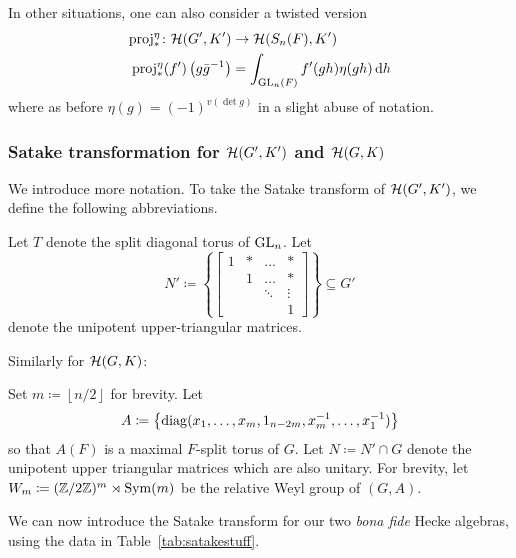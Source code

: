 In other situations, one can also consider a twisted version
\begin{align*}
  \rproj_\ast^\eta \colon \HH(G', K') &\to \HH(S_n(F), K') \\
  \rproj_\ast^\eta(f')\left( g\bar{g}\inv \right) &= \int_{\GL_n(F)} f'(gh) \eta(gh) \odif h
\end{align*}
where as before $\eta(g) = (-1)^{v(\det g)}$ in a slight abuse of notation.

\subsubsection{Satake transformation for $\mathcal H(G',K')$ and $\mathcal H(G,K)$}
We introduce more notation.
To take the Satake transform of $\mathcal H(G', K')$, we define the following abbreviations.
\begin{itemize}
  \ii Let $T$ denote the split diagonal torus of $\operatorname{GL}_n$.
  \ii Let
  \[ N' \coloneqq \left\{ \begin{bmatrix}
      1 & \ast & \dots & \ast \\
        & 1 & \dots & \ast \\
        &   & \ddots & \vdots \\
        &   &   & 1 \end{bmatrix}\right\} \subseteq G' \]
  denote the unipotent upper-triangular matrices.
\end{itemize}
Similarly for $\mathcal H(G, K)$:
\begin{itemize}
  \ii Set $m \coloneqq \left\lfloor n/2 \right\rfloor$ for brevity.
  \ii Let
  \[ A \coloneqq \left\{
    \operatorname{diag}(x_1, \dots, x_m, 1_{n-2m}, x_m^{-1}, \dots, x_1^{-1}) \right\} \]
  so that $A(F)$ is a maximal $F$-split torus of $G$.
  \ii Let $N \coloneqq N' \cap G$ denote the unipotent upper triangular matrices
  which are also unitary.
  \ii For brevity, let $W_m \coloneqq (\mathbb Z/2\mathbb Z)^m \rtimes \operatorname{Sym}(m)$
  be the relative Weyl group of $(G,A)$.
\end{itemize}

We can now introduce the Satake transform for our two
\emph{bona fide} Hecke algebras, using the data in Table~\ref{tab:satakestuff}.

